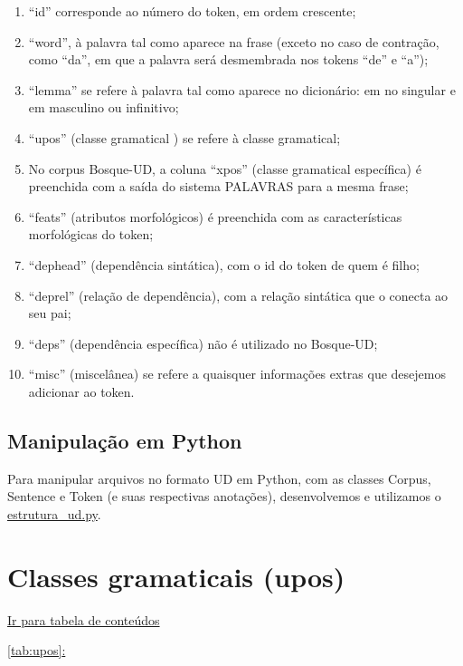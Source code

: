 \documentclass[output=paper,colorlinks,citecolor=brown]{langscibook}
\newcommand*{\fullref}[1]{\hyperref[{#1}]{\autoref*{#1}: \nameref*{#1}}} %
\begin{document}
\begin{enumerate}
    \item “id” corresponde ao número do token, em ordem crescente;
    \item “word”, à palavra tal como aparece na frase (exceto no caso de contração, como “da”, em que a palavra será desmembrada nos tokens “de” e “a”);
    \item “lemma” se refere à palavra tal como aparece no dicionário: em no singular e em masculino ou infinitivo;
    \item “upos” (classe gramatical ) se refere à classe gramatical;
    \item No corpus Bosque-UD, a coluna “xpos” (classe gramatical específica) é preenchida com a saída do sistema PALAVRAS para a mesma frase;
    \item “feats” (atributos morfológicos) é preenchida com as características morfológicas do token;
    \item “dephead” (dependência sintática), com o id do token de quem é filho;
    \item “deprel” (relação de dependência), com a relação sintática que o conecta ao seu pai;
    \item “deps” (dependência específica) não é utilizado no Bosque-UD;
    \item “misc” (miscelânea) se refere a quaisquer informações extras que desejemos adicionar ao token.
\end{enumerate}{}

\section{Manipulação em Python}\label{sec:python}



Para manipular arquivos no formato UD em Python, com as classes Corpus, Sentence e Token (e suas respectivas anotações), desenvolvemos e utilizamos o \href{https://github.com/alvelvis/ACDC-UD/blob/master/estrutura_ud.py}{estrutura\_ud.py}.

\chapter{Classes gramaticais (upos)}\label{sec:upos}

\hyperlink{toc}{Ir para tabela de conteúdos\\}

\fullref{tab:upos}
\end{document}
